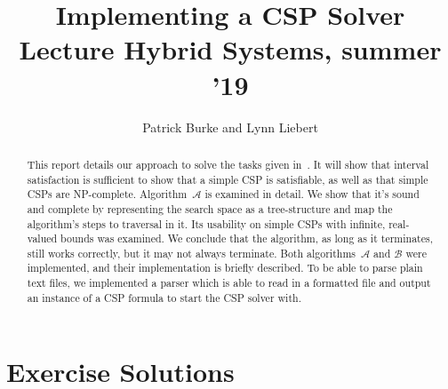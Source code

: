 \documentclass{article}
\title{Implementing a CSP Solver\\\small{Lecture Hybrid Systems, summer '19}}
\author{Patrick Burke and Lynn Liebert}
\begin{document}
\maketitle %

\listoftodos

\begin{abstract}
This report details our approach to solve the tasks given in~\cite{MF19}.
It will show that interval satisfaction is sufficient to show that a simple CSP is satisfiable, as well as that simple CSPs are NP-complete.
Algorithm~$\mathcal{A}$ is examined in detail.
We show that it's sound and complete by representing the search space as a tree-structure and map the algorithm's steps to traversal in it.
Its usability on simple CSPs with infinite, real-valued bounds was examined.
We conclude that the algorithm, as long as it terminates, still works correctly, but it may not always terminate.
Both algorithms~$\mathcal{A}$ and $\mathcal{B}$ were implemented, and their implementation is briefly described.
To be able to parse plain text files, we implemented a parser which is able to read in a formatted file and output an instance of a CSP formula to start the CSP solver with.
\end{abstract}

\tableofcontents
\newpage


\newpage


\section{Exercise Solutions}












%

\clearpage
\appendix
\appendixpage




\end{document}
